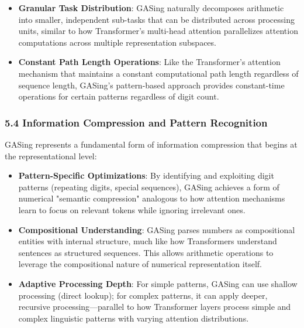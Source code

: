 \begin{itemize}
\item \textbf{Granular Task Distribution}: GASing naturally decomposes arithmetic into smaller, independent sub-tasks that can be distributed across processing units, similar to how Transformer's multi-head attention parallelizes attention computations across multiple representation subspaces.
\end{itemize}

\begin{itemize}
\item \textbf{Constant Path Length Operations}: Like the Transformer's attention mechanism that maintains a constant computational path length regardless of sequence length, GASing's pattern-based approach provides constant-time operations for certain patterns regardless of digit count.
\end{itemize}
\subsubsection{5.4 Information Compression and Pattern Recognition}

GASing represents a fundamental form of information compression that begins at the representational level:

\begin{itemize}
\item \textbf{Pattern-Specific Optimizations}: By identifying and exploiting digit patterns (repeating digits, special sequences), GASing achieves a form of numerical "semantic compression" analogous to how attention mechanisms learn to focus on relevant tokens while ignoring irrelevant ones.
\end{itemize}

\begin{itemize}
\item \textbf{Compositional Understanding}: GASing parses numbers as compositional entities with internal structure, much like how Transformers understand sentences as structured sequences. This allows arithmetic operations to leverage the compositional nature of numerical representation itself.
\end{itemize}

\begin{itemize}
\item \textbf{Adaptive Processing Depth}: For simple patterns, GASing can use shallow processing (direct lookup); for complex patterns, it can apply deeper, recursive processing—parallel to how Transformer layers process simple and complex linguistic patterns with varying attention distributions.
\end{itemize}
